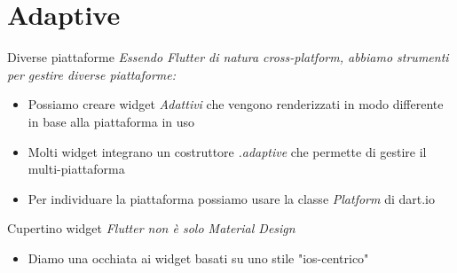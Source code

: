 \documentclass{../libs/presentation_format}
\begin{document}
\section{Adaptive}
\begin{frame}{Diverse piattaforme}
	\emph{Essendo Flutter di natura cross-platform, abbiamo strumenti per gestire diverse piattaforme:}
	\begin{itemize}
		\item Possiamo creare widget \emph{Adattivi} che vengono renderizzati in modo differente in base alla piattaforma in uso
		\item Molti widget integrano un costruttore \emph{.adaptive} che permette di gestire il multi-piattaforma
		\item Per individuare la piattaforma possiamo usare la classe \emph{Platform} di dart.io
	\end{itemize}
\end{frame}


\begin{frame}{Cupertino widget}
	\emph{Flutter non è solo Material Design}
	\begin{itemize}
		\item Diamo una occhiata ai widget basati su uno stile "ios-centrico"
	\end{itemize}
	\centering
	\href{https://docs.flutter.dev/development/ui/widgets/cupertino}{}
\end{frame}

\end{document}

